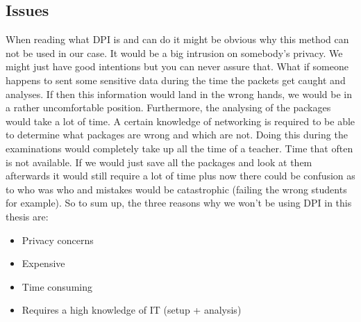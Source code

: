 \subsection{Issues}
When reading what DPI is and can do it might be obvious why this method can not be used in our case. It would be a big intrusion on somebody's privacy. We might just have good intentions but you can never assure that. What if someone happens to sent some sensitive data during the time the packets get caught and analyses. If then this information would land in the wrong hands, we would be in a rather uncomfortable position. Furthermore, the analysing of the packages would take a lot of time. A certain knowledge of networking is required to be able to determine what packages are wrong and which are not. Doing this during the examinations would completely take up all the time of a teacher. Time that often is not available. If we would just save all the packages and look at them afterwards it would still require a lot of time plus now there could be confusion as to who was who and mistakes would be catastrophic (failing the wrong students for example).
So to sum up, the three reasons why we won't be using DPI in this thesis are:
\begin{itemize}
\item Privacy concerns
\item Expensive
\item Time consuming
\item Requires a high knowledge of IT (setup + analysis)
\end{itemize}









